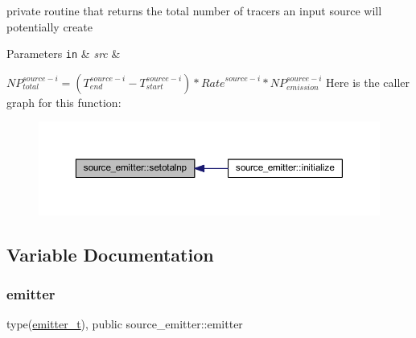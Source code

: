 private routine that returns the total number of tracers an input source will potentially create 
\begin{DoxyParams}[1]{Parameters}
\mbox{\tt in}  & {\em src} & \\
\hline
\end{DoxyParams}
${NP}_{total}^{source-i}=(T_{end}^{source-i}-T_{start}^{source-i})*{Rate}^{source-i}*{NP}_{emission}^{source-i}$ Here is the caller graph for this function\+:
\nopagebreak
\begin{figure}[H]
\begin{center}
\leavevmode
\includegraphics[width=350pt]{namespacesource__emitter_a73d054a39fc1fccfde74173a5c7f2c58_icgraph}
\end{center}
\end{figure}


\subsection{Variable Documentation}
\mbox{\label{namespacesource__emitter_a357876a84a74e23c44e92ab8ef7dc35e}} 
\subsubsection{\texorpdfstring{emitter}{emitter}}
{\footnotesize\ttfamily type(\mbox{\hyperlink{structsource__emitter_1_1emitter__t}{emitter\+\_\+t}}), public source\+\_\+emitter\+::emitter}

